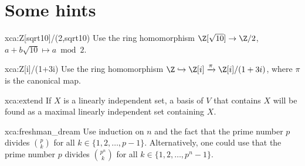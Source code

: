 \chapter*{Some hints}


\begin{sol}{xca:Z[sqrt10]/(2,sqrt10)}
	Use the ring homomorphism $\Z[\sqrt{10}]\to\Z/2$, $a+b\sqrt{10}\mapsto a\bmod 2$. 	
\end{sol}

\begin{sol}{xca:Z[i]/(1+3i)}
	Use the ring homomorphism $\Z\hookrightarrow\Z[i]\xrightarrow{\pi}\Z[i]/(1+3i)$, where
	$\pi$ is the canonical map. 	
\end{sol}

\begin{sol}{xca:extend}
    If $X$ is a linearly independent set, a basis 
    of $V$ that contains $X$ will be found as a maximal linearly independent set 
    containing $X$. 
\end{sol}

\begin{sol}{xca:freshman_dream}
    Use induction on $n$ and the fact that the prime number $p$ divides 
    $\binom{p}{k}$ for all $k\in\{1,2,\dots,p-1\}$. Alternatively, one could use
    that the prime number $p$ divides $\binom{p^n}{k}$ for all 
    $k\in\{1,2,\dots,p^n-1\}$. 
\end{sol}



